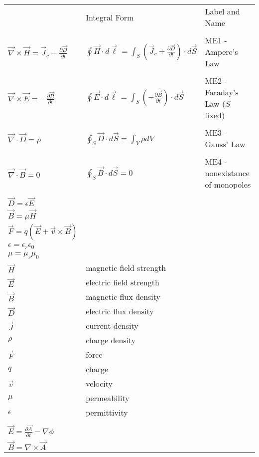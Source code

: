 \begin{tabular}{lll}
   \centering{Point Form} & Integral Form & Label and Name \\
              &               &                \\
    $\vec \nabla \times \vec H = {\vec J}_c + \frac{\partial {\vec D}}{\partial t}$ & 
    $\oint {\vec H} \cdot d {\vec \ell} = \int_S \left( {\vec J}_c + \frac{\partial {\vec D}}{\partial t} \right) \cdot d {\vec S}$ &
    ME1 - Ampere's Law\\
              &               &                \\     
    $\vec \nabla \times \vec E = -\frac{\partial \vec B}{\partial t}$ &
    $\oint \vec E \cdot d \vec \ell = \int_S \left(-\frac{\partial \vec B}{\partial t} \right) \cdot d \vec S$ &
    ME2 - Faraday's Law ($S$ fixed) \\
              &               &                \\     
    $\vec \nabla \cdot \vec D = \rho$ &
    $\oint_S \vec D \cdot d \vec S = \int_V \rho d V$ &
    ME3 - Gauss' Law\\
              &               &                \\     
    $\vec \nabla \cdot \vec B = 0$ &
    $\oint_S \vec B \cdot d \vec S = 0 $ &
    ME4 - nonexistance of monopoles    \\
              &               &                \\
    ${\vec D} = \epsilon {\vec E}$ & & \\
    ${\vec B} = \mu      {\vec H}$ & & \\
    ${\vec F} = q \left( {\vec E} + {\vec v} \times {\vec B} \right)$    & &    \\
    $\epsilon = \epsilon_r \epsilon_0$ & & \\
    $\mu      = \mu_r      \mu_0$      & & \\
    $\vec H$   & magnetic field strength & \\
    $\vec E$   & electric field strength & \\
    $\vec B$   & magnetic flux density   & \\
    $\vec D$   & electric flux density   & \\
    $\vec J$   & current density         & \\
    $\rho  $   & charge density          & \\
    $\vec F$   & force                   & \\
    $q$        & charge                  & \\
    $\vec v$   & velocity                & \\
    $\mu$      & permeability            & \\
    $\epsilon$ & permittivity            & \\
               &                         & \\
    ${\vec E} = \frac{\partial \vec A}{\partial t} - \nabla \phi$ & & \\
    ${\vec B} = \nabla \times {\vec A}$ & & \\
\end{tabular}
